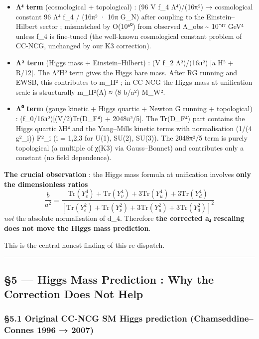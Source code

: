 \documentclass[
  11pt,
  a4paper,
]{article}
\begin{document}
\begin{itemize}
\item
  \textbf{Λ⁴ term} (cosmological + topological) : (96 V f\_4 Λ⁴)/(16π²) → cosmological constant 96 Λ⁴ f\_4 / (16π² · 16π G\_N) after coupling to the Einstein--Hilbert sector ; mismatched by O(10⁶⁰) from observed Λ\_obs \textasciitilde{} 10⁻⁴⁷ GeV⁴ unless f\_4 is fine-tuned (the well-known cosmological constant problem of CC-NCG, unchanged by our K3 correction).
\item
  \textbf{Λ² term} (Higgs mass + Einstein--Hilbert) : (V f\_2 Λ²)/(16π²) {[}a \textbar H\textbar² + R/12{]}. The Λ²\textbar H\textbar² term gives the Higgs bare mass. After RG running and EWSB, this contributes to m\_H² ; in CC-NCG the Higgs mass at unification scale is structurally m\_H²(Λ) ≈ (8 b/a²) M\_W².
\item
  \textbf{Λ⁰ term} (gauge kinetic + Higgs quartic + Newton G running + topological) : (f\_0/16π²){[}(V/2)Tr(D\_F⁴) + 2048π²/5{]}. The Tr(D\_F⁴) part contains the Higgs quartic λ\textbar H\textbar⁴ and the Yang--Mills kinetic terms with normalisation (1/(4 g²\_i)) F²\_i (i = 1,2,3 for U(1), SU(2), SU(3)). The 2048π²/5 term is purely topological (a multiple of χ(K3) via Gauss--Bonnet) and contributes only a constant (no field dependence).
\end{itemize}

\textbf{The crucial observation} : the Higgs mass formula at unification involves \textbf{only the dimensionless ratios}
\[
\frac{b}{a^2} = \frac{\mathrm{Tr}(Y_e^4) + \mathrm{Tr}(Y_\nu^4) + 3\mathrm{Tr}(Y_u^4) + 3\mathrm{Tr}(Y_d^4)}{[\mathrm{Tr}(Y_e^2) + \mathrm{Tr}(Y_\nu^2) + 3\mathrm{Tr}(Y_u^2) + 3\mathrm{Tr}(Y_d^2)]^2}
\]
\emph{not} the absolute normalisation of d\_4. Therefore \textbf{the corrected a₄ rescaling does not move the Higgs mass prediction}.

This is the central honest finding of this re-dispatch.

\begin{center}\rule{0.5\linewidth}{0.5pt}\end{center}

\hypertarget{higgs-mass-prediction-why-the-correction-does-not-help}{%
\subsection{§5 --- Higgs Mass Prediction : Why the Correction Does Not Help}\label{higgs-mass-prediction-why-the-correction-does-not-help}}

\hypertarget{original-cc-ncg-sm-higgs-prediction-chamseddineconnes-1996-2007}{%
\subsubsection{§5.1 Original CC-NCG SM Higgs prediction (Chamseddine--Connes 1996 → 2007)}\label{original-cc-ncg-sm-higgs-prediction-chamseddineconnes-1996-2007}}
\end{document}

